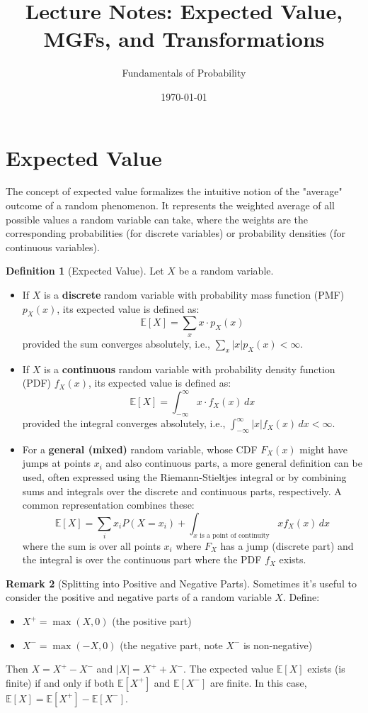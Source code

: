 \documentclass[11pt]{article}
\title{Lecture Notes: Expected Value, MGFs, and Transformations}
\author{Fundamentals of Probability}
\date{\today}
\theoremstyle{definition}
\newtheorem{definition}{Definition}[section]
\newtheorem{remark}[definition]{Remark}
\newcommand{\E}{\mathbb{E}} %
\begin{document}
\maketitle

\section{Expected Value}

The concept of expected value formalizes the intuitive notion of the "average" outcome of a random phenomenon. It represents the weighted average of all possible values a random variable can take, where the weights are the corresponding probabilities (for discrete variables) or probability densities (for continuous variables).

\begin{definition}[Expected Value]
Let $X$ be a random variable.
\begin{itemize}
    \item If $X$ is a \textbf{discrete} random variable with probability mass function (PMF) $p_X(x)$, its expected value is defined as:
    \[ \E[X] = \sum_{x} x \cdot p_X(x) \]
    provided the sum converges absolutely, i.e., $\sum_{x} |x| p_X(x) < \infty$.

    \item If $X$ is a \textbf{continuous} random variable with probability density function (PDF) $f_X(x)$, its expected value is defined as:
    \[ \E[X] = \int_{-\infty}^{\infty} x \cdot f_X(x) \, dx \]
    provided the integral converges absolutely, i.e., $\int_{-\infty}^{\infty} |x| f_X(x) \, dx < \infty$.

    \item For a \textbf{general (mixed)} random variable, whose CDF $F_X(x)$ might have jumps at points $x_i$ and also continuous parts, a more general definition can be used, often expressed using the Riemann-Stieltjes integral or by combining sums and integrals over the discrete and continuous parts, respectively. A common representation combines these:
    \[ \E[X] = \sum_{i} x_i P(X=x_i) + \int_{x \text{ is a point of continuity}} x f_X(x) \, dx \]
    where the sum is over all points $x_i$ where $F_X$ has a jump (discrete part) and the integral is over the continuous part where the PDF $f_X$ exists.
\end{itemize}
\end{definition}

\begin{remark}[Splitting into Positive and Negative Parts]
Sometimes it's useful to consider the positive and negative parts of a random variable $X$. Define:
\begin{itemize}
    \item $X^+ = \max(X, 0)$ (the positive part)
    \item $X^- = \max(-X, 0)$ (the negative part, note $X^-$ is non-negative)
\end{itemize}
Then $X = X^+ - X^-$ and $|X| = X^+ + X^-$. The expected value $\E[X]$ exists (is finite) if and only if both $\E[X^+]$ and $\E[X^-]$ are finite. In this case, $\E[X] = \E[X^+] - \E[X^-]$.
\end{remark}
\end{document}
